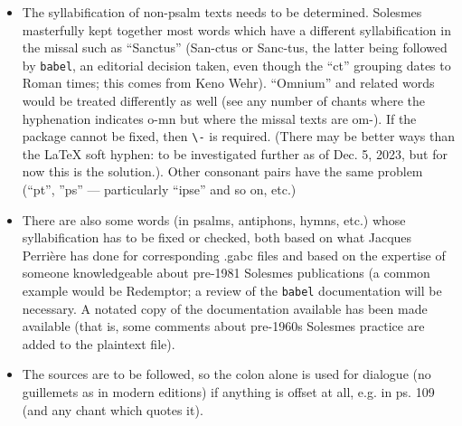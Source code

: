 \documentclass[11pt]{article}
\begin{document}
\begin{itemize}
\item
The syllabification of non-psalm texts needs to be determined. Solesmes masterfully kept together most words which have a different syllabification in the missal such as ``Sanctus'' (San-ctus or Sanc-tus, the latter being followed by \verb|babel|, an editorial decision taken, even though the ``ct'' grouping dates to Roman times; this comes from Keno Wehr). ``Omnium'' and related words would be treated differently as well (see any number of chants where the hyphenation indicates o-mn but where the missal texts are om-). If the package cannot be fixed, then \verb|\-| is required. (There may be better ways than the LaTeX soft hyphen: to be investigated further as of Dec. 5, 2023, but for now this is the solution.). Other consonant pairs have the same problem (``pt'', ''ps'' — particularly ``ipse'' and so on, etc.)

\item
There are also some words (in psalms, antiphons, hymns, etc.) whose syllabification has to be fixed or checked, both based on what Jacques Perrière has done for corresponding .gabc files and based on the expertise of someone knowledgeable about pre-1981 Solesmes publications (a common example would be Redemptor; a review of the \verb|babel| documentation will be necessary. A notated copy of the documentation available has been made available (that is, some comments about pre-1960s Solesmes practice are added to the plaintext file).

\item
The sources are to be followed, so the colon alone is used for dialogue (no guillemets as in modern editions) if anything is offset at all, e.g. in ps. 109 (and any chant which quotes it).

\end{itemize}
\end{document}
